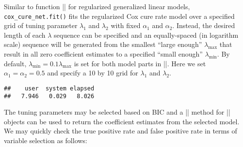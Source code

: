 Similar to function
\VERB|\OperatorTok{::}\NormalTok{()}|
for regularized generalized linear models, \texttt{cox\_cure\_net.fit()}
fits the regularized Cox cure rate model over a specified grid of tuning
parameter \(\lambda_1\) and \(\lambda_2\) with fixed \(\alpha_1\) and
\(\alpha_2\). Instead, the desired length of each \(\lambda\) sequence
can be specified and an equally-spaced (in logarithm scale) sequence
will be generated from the smallest ``large enough'' \(\lambda_{\max}\)
that result in all zero coefficient estimates to a specified ``small
enough'' \(\lambda_{\min}\). By default,
\(\lambda_{\min}=0.1\lambda_{\max}\) is set for both model parts in
\VERB|\NormalTok{()}|. Here we set
\(\alpha_1 = \alpha_2 = 0.5\) and specify a 10 by 10 grid for
\(\lambda_1\) and \(\lambda_2\).

\begin{Shaded}
\begin{Highlighting}[]
\NormalTok{(\{}
\StringTok{ }\NormalTok{(}
        \OperatorTok{$}\OperatorTok{$}
         \NormalTok{, } \NormalTok{,}
         \NormalTok{, } 
\NormalTok{    )}
\NormalTok{\})}
\end{Highlighting}
\end{Shaded}

\begin{verbatim}
##    user  system elapsed 
##   7.946   0.029   8.026
\end{verbatim}

The tuning parameters may be selected based on BIC and a
\VERB|\NormalTok{()}| method for
\VERB|| objects can be used to return the
coefficient estimates from the selected model. We may quickly check the
true positive rate and false positive rate in terms of variable
selection as follows:

